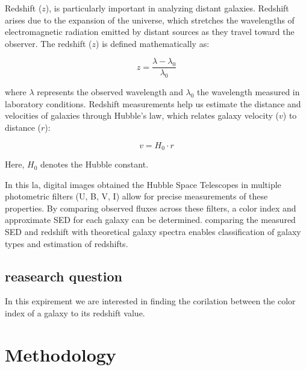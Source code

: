 \documentclass[11pt,a4paper]{article}
\begin{document}
Redshift ($z$), is particularly important in analyzing distant galaxies. Redshift arises due to the expansion of the universe, which stretches the wavelengths of electromagnetic radiation emitted by distant sources as they travel toward the observer. The redshift ($z$) is defined mathematically as:

\begin{equation}
 z =  \frac{\lambda - \lambda_0}{\lambda_0}
\end{equation}



where $\lambda$ represents the observed wavelength and $\lambda_0$ the  wavelength measured in laboratory conditions. Redshift measurements help us estimate the distance and velocities of galaxies through Hubble's law, which relates galaxy velocity ($v$) to distance ($r$):

\begin{equation}
  v = H_0 \cdot r
\end{equation}


Here, $H_0$ denotes the Hubble constant.

In this la, digital images obtained the Hubble Space Telescopes in multiple photometric filters (U, B, V, I) allow for precise measurements of these properties. By comparing observed fluxes across these filters, a color index and approximate SED for each galaxy can be determined. comparing the measured SED and redshift with theoretical galaxy spectra enables classification of galaxy types and estimation of redshifts.


\subsection{reasearch question}
In this expirement we are interested in finding the corilation between the color index of a galaxy to its redshift value.


\pagebreak
\section{Methodology}
\end{document}
